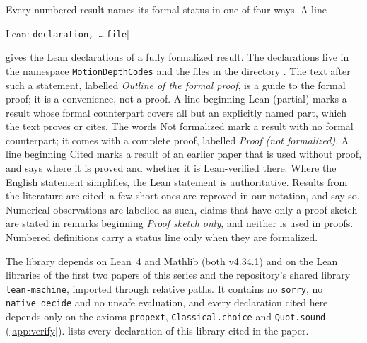 Every numbered result names its formal status in one of four ways. A line
\begin{center}
{\small\textsf{Lean:} \texttt{declaration, \dots}\hfill[\texttt{file}]}
\end{center}
gives the Lean declarations of a fully formalized result. The declarations live in the namespace
\texttt{MotionDepthCodes} and the files in the directory . The text after such a statement, labelled \emph{Outline of
the formal proof}, is a guide to the formal proof; it is a convenience, not a proof. A line beginning \textsf{Lean
(partial)} marks a result whose formal counterpart covers all but an explicitly named part, which the text proves or
cites. The words \textsf{Not formalized} mark a result with no formal counterpart; it comes with a complete proof,
labelled \emph{Proof (not formalized)}. A line beginning \textsf{Cited} marks a result of an earlier paper that is used
without proof, and says where it is proved and whether it is Lean-verified there. Where the English statement
simplifies, the Lean statement is authoritative.
Results from the literature are cited; a few short ones are reproved in our notation, and say so. Numerical
observations are labelled as such, claims that have only a proof sketch are stated in remarks beginning \emph{Proof sketch
only}, and neither is used in proofs. Numbered definitions carry a status line only when they
are formalized.

The library depends on Lean~4 and Mathlib (both v4.34.1) and on the Lean libraries of the first two papers of this
series and the repository's shared library \texttt{lean-machine}, imported through relative paths. It contains no \texttt{sorry}, no \texttt{native\_decide} and no unsafe
evaluation, and every declaration cited here depends only on the axioms \texttt{propext}, \texttt{Classical.choice} and
\texttt{Quot.sound} (\cref{app:verify}).  lists every declaration of this library cited in the paper.
